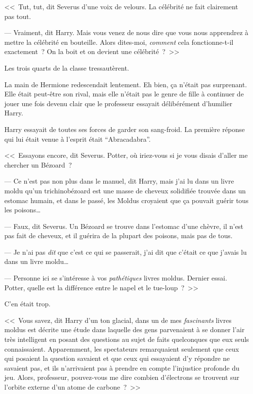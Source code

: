 <<~Tut, tut, dit Severus d'une voix de velours. La célébrité ne fait clairement pas tout.

--- Vraiment, dit Harry. Mais vous venez de nous dire que vous nous apprendrez à mettre la célébrité en bouteille. Alors dites-moi, \emph{comment} cela fonctionne-t-il exactement~? On la boit et on devient une célébrité~?~>>

Les trois quarts de la classe tressautèrent.

La main de Hermione redescendait lentement. Eh bien, ça n'était pas surprenant. Elle était peut-être son rival, mais elle n'était pas le genre de fille à continuer de jouer une fois devenu clair que le professeur essayait délibérément d'humilier Harry.

Harry essayait de toutes ses forces de garder son sang-froid. La première réponse qui lui était venue à l'esprit était “Abracadabra”.

<<~Essayons encore, dit Severus. Potter, où iriez-vous si je vous disais d'aller me chercher un Bézoard~?

--- Ce n'est pas non plus dans le manuel, dit Harry, mais j'ai lu dans un livre moldu qu'un trichinobézoard est une masse de cheveux solidifiée trouvée dans un estomac humain, et dans le passé, les Moldus croyaient que ça pouvait guérir tous les poisons…

--- Faux, dit Severus. Un Bézoard se trouve dans l'estomac d'une chèvre, il n'est pas fait de cheveux, et il guérira de la plupart des poisons, mais pas de tous.

--- Je n'ai pas \emph{dit} que c'est ce qui se passerait, j'ai dit que c'était ce que j'avais lu dans un livre moldu…

--- Personne ici se s'intéresse à vos \emph{pathétiques} livres moldus. Dernier essai. Potter, quelle est la différence entre le napel et le tue-loup~?~>>

C'en était trop.

<<~Vous savez, dit Harry d'un ton glacial, dans un de mes \emph{fascinants} livres moldus est décrite une étude dans laquelle des gens parvenaient à se donner l'air très intelligent en posant des questions au sujet de faits quelconques que eux seuls connaissaient. Apparemment, les spectateurs remarquaient seulement que ceux qui posaient la question savaient et que ceux qui essayaient d'y répondre ne savaient pas, et ils n'arrivaient pas à prendre en compte l'injustice profonde du jeu. Alors, professeur, pouvez-vous me dire combien d'électrons se trouvent sur l'orbite externe d'un atome de carbone~?~>>

